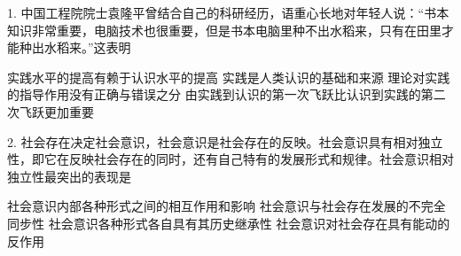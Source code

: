1. 中国工程院院士袁隆平曾结合自己的科研经历，语重心长地对年轻人说：“书本知识非常重要，电脑技术也很重要，但是书本电脑里种不出水稻来，只有在田里才能种出水稻来。”这表明
\begin{choices}
	 实践水平的提高有赖于认识水平的提高
	 实践是人类认识的基础和来源
	 理论对实践的指导作用没有正确与错误之分
	 由实践到认识的第一次飞跃比认识到实践的第二次飞跃更加重要
\end{choices}

2. 社会存在决定社会意识，社会意识是社会存在的反映。社会意识具有相对独立性，即它在反映社会存在的同时，还有自己特有的发展形式和规律。社会意识相对独立性最突出的表现是
\begin{choices}
	 社会意识内部各种形式之间的相互作用和影响
	 社会意识与社会存在发展的不完全同步性
	 社会意识各种形式各自具有其历史继承性
	 社会意识对社会存在具有能动的反作用
\end{choices}

